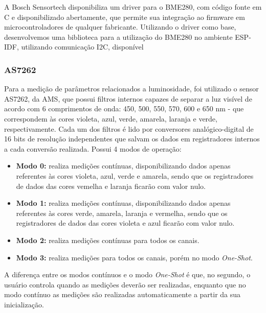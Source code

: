 \documentclass[../monografia.tex]{subfiles}
\begin{document}
A Bosch Sensortech disponibiliza um driver para o BME280, com código fonte em C e disponibilizado abertamente\cite{bme280-driver}, que permite sua integração ao firmware em microcontroladores de qualquer fabricante. 
Utilizando o driver como base, desenvolvemos uma biblioteca para a utilização do BME280 no ambiente ESP-IDF, utilizando comunicação I2C, disponível



\subsubsection{AS7262}

Para a medição de parâmetros relacionados a luminosidade, foi utilizado o sensor AS7262, da AMS, que possui filtros internos capazes de separar a luz visível de acordo com 6 comprimentos de onda: 450, 500, 550, 570, 600 e 650 nm - que correspondem às cores violeta, azul, verde, amarela, laranja e verde, respectivamente. Cada um dos filtros é lido por conversores analógico-digital de 16 bits de resolução independentes que salvam os dados em registradores internos a cada conversão realizada. Possui 4 modos de operação:

\begin{itemize}
	\item \textbf{Modo 0:} realiza medições contínuas, disponibilizando dados apenas referentes às cores violeta, azul, verde e amarela, sendo que os registradores de dados das cores vemelha e laranja ficarão com valor nulo.
	\item \textbf{Modo 1:} realiza medições contínuas, disponibilizando dados apenas referentes às cores verde, amarela, laranja e vermelha, sendo que os registradores de dados das cores violeta e azul ficarão com valor nulo.
	\item \textbf{Modo 2:} realiza medições contínuas para todos os canais.
	\item \textbf{Modo 3:} realiza medições para todos os canais, porém no modo \textit{One-Shot}.
\end{itemize}

A diferença entre os modos contínuos e o modo \textit{One-Shot} é que, no segundo, o usuário controla quando as medições deverão ser realizadas, enquanto que no modo contínuo as medições são realizadas automaticamente a partir da sua inicialização.
\end{document}
